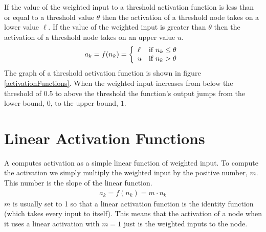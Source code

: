    If the value of the weighted input to a threshold activation function is less 
than or equal to a threshold value $\theta$ then the activation of a threshold 
node takes on a lower value $\ell$. If the value of the weighted input is greater 
than $\theta$ then the activation of a threshold node takes on an upper value 
$u$.
\begin{eqnarray*}
    a_k = f(n_k) =  \left\{
        \begin{array}{lc}
        \ell & {\rm if} \; n_k \leq \theta \\
        u  & {\rm if} \;  n_k >  \theta
    \end{array} 
    \right.
\end{eqnarray*}
The graph of a  threshold activation function is shown in figure \ref{activationFunctions}. When the 
weighted input increases from below the threshold of $0.5$ to above the threshold 
the function's output jumps from the lower bound, $0$, to the upper bound, 
$1$.



\section{Linear Activation Functions}\label{S:linearact}

 A  computes activation as a simple linear function 
of weighted input. To compute the activation we simply multiply the weighted input 
by the positive number, $m$. This number is the slope of the linear function.
\begin{eqnarray*}
a_k = f(n_k) = m  \cdot n_k
\end{eqnarray*}
$m$ is usually set to 1 so that a linear activation function is the identity function (which takes every input to itself). This means that the activation of a node when it uses a linear activation with $m = 1$ just is the weighted inputs to the node.


